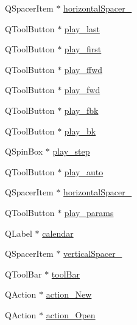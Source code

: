 \begin{DoxyCompactItemize}
\item 
Q\+Spacer\+Item $\ast$ \mbox{\hyperlink{class_ui___main_window_a9a022556cf8ce3fa47e51d79cb222ab0}{horizontal\+Spacer\+\_}}
\item 
Q\+Tool\+Button $\ast$ \mbox{\hyperlink{class_ui___main_window_a7f836c0dc7856a52bce06235cdcf4c17}{play\+\_\+last}}
\item 
Q\+Tool\+Button $\ast$ \mbox{\hyperlink{class_ui___main_window_a7e72df9485d84f9040e3d47219cdf583}{play\+\_\+first}}
\item 
Q\+Tool\+Button $\ast$ \mbox{\hyperlink{class_ui___main_window_a95e3600ae2358df6d4dd64c4fbc60741}{play\+\_\+ffwd}}
\item 
Q\+Tool\+Button $\ast$ \mbox{\hyperlink{class_ui___main_window_acb4a4df5e12ebd1047d70b59469f0758}{play\+\_\+fwd}}
\item 
Q\+Tool\+Button $\ast$ \mbox{\hyperlink{class_ui___main_window_a2f23e452f87650612e4f8f7fa09ef740}{play\+\_\+fbk}}
\item 
Q\+Tool\+Button $\ast$ \mbox{\hyperlink{class_ui___main_window_a35431f16c170d2dc142cb046461558c1}{play\+\_\+bk}}
\item 
Q\+Spin\+Box $\ast$ \mbox{\hyperlink{class_ui___main_window_a1323f7ffa4f437537ce466bf5c2c705a}{play\+\_\+step}}
\item 
Q\+Tool\+Button $\ast$ \mbox{\hyperlink{class_ui___main_window_abc387b7474271c29ef45e20efb000daa}{play\+\_\+auto}}
\item 
Q\+Spacer\+Item $\ast$ \mbox{\hyperlink{class_ui___main_window_ae2007c6e48638f819d3ac57be8daa4ca}{horizontal\+Spacer\+\_}}
\item 
Q\+Tool\+Button $\ast$ \mbox{\hyperlink{class_ui___main_window_a77567fc2bbdb2cec35d274ccceb2ea2d}{play\+\_\+params}}
\item 
Q\+Label $\ast$ \mbox{\hyperlink{class_ui___main_window_ab5f3372b83525938c41177ba056dad26}{calendar}}
\item 
Q\+Spacer\+Item $\ast$ \mbox{\hyperlink{class_ui___main_window_adc1f5fdd97fb3729999c56902d0fa591}{vertical\+Spacer\+\_}}
\item 
Q\+Tool\+Bar $\ast$ \mbox{\hyperlink{class_ui___main_window_ab84dc49349f514d7b7d3fe8e78de069b}{tool\+Bar}}
\item 
Q\+Action $\ast$ \mbox{\hyperlink{class_ui___main_window_acc2eae8e3c8dfda35f91051973c7fd85}{action\+\_\+\+New}}
\item 
Q\+Action $\ast$ \mbox{\hyperlink{class_ui___main_window_a8519e56bcc446c498bcba56d30b3dee4}{action\+\_\+\+Open}}
\item 

\end{DoxyCompactItemize}
